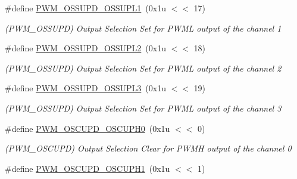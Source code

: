 \begin{DoxyCompactItemize}
\mbox{\label{group__SAMV71__PWM_ga3326e4bb5f84da296e7ac992ac029553}} 
\#define \mbox{\hyperlink{group__SAMV71__PWM_ga3326e4bb5f84da296e7ac992ac029553}{P\+W\+M\+\_\+\+O\+S\+S\+U\+P\+D\+\_\+\+O\+S\+S\+U\+P\+L1}}~(0x1u $<$$<$ 17)
\begin{DoxyCompactList}\small\item\em (P\+W\+M\+\_\+\+O\+S\+S\+U\+PD) Output Selection Set for P\+W\+ML output of the channel 1 \end{DoxyCompactList}\item 
\mbox{\label{group__SAMV71__PWM_ga3e9d15e834de3bb5db7f1549d86f1a57}} 
\#define \mbox{\hyperlink{group__SAMV71__PWM_ga3e9d15e834de3bb5db7f1549d86f1a57}{P\+W\+M\+\_\+\+O\+S\+S\+U\+P\+D\+\_\+\+O\+S\+S\+U\+P\+L2}}~(0x1u $<$$<$ 18)
\begin{DoxyCompactList}\small\item\em (P\+W\+M\+\_\+\+O\+S\+S\+U\+PD) Output Selection Set for P\+W\+ML output of the channel 2 \end{DoxyCompactList}\item 
\mbox{\label{group__SAMV71__PWM_ga2e53b31cb8b3a9ce73db36088eb131f1}} 
\#define \mbox{\hyperlink{group__SAMV71__PWM_ga2e53b31cb8b3a9ce73db36088eb131f1}{P\+W\+M\+\_\+\+O\+S\+S\+U\+P\+D\+\_\+\+O\+S\+S\+U\+P\+L3}}~(0x1u $<$$<$ 19)
\begin{DoxyCompactList}\small\item\em (P\+W\+M\+\_\+\+O\+S\+S\+U\+PD) Output Selection Set for P\+W\+ML output of the channel 3 \end{DoxyCompactList}\item 
\mbox{\label{group__SAMV71__PWM_gaf19f80cf218be24bc6d033802d46735d}} 
\#define \mbox{\hyperlink{group__SAMV71__PWM_gaf19f80cf218be24bc6d033802d46735d}{P\+W\+M\+\_\+\+O\+S\+C\+U\+P\+D\+\_\+\+O\+S\+C\+U\+P\+H0}}~(0x1u $<$$<$ 0)
\begin{DoxyCompactList}\small\item\em (P\+W\+M\+\_\+\+O\+S\+C\+U\+PD) Output Selection Clear for P\+W\+MH output of the channel 0 \end{DoxyCompactList}\item 
\mbox{\label{group__SAMV71__PWM_ga7520de992c0db573287f89908f651fa7}} 
\#define \mbox{\hyperlink{group__SAMV71__PWM_ga7520de992c0db573287f89908f651fa7}{P\+W\+M\+\_\+\+O\+S\+C\+U\+P\+D\+\_\+\+O\+S\+C\+U\+P\+H1}}~(0x1u $<$$<$ 1)
$$
\end{DoxyCompactItemize}
